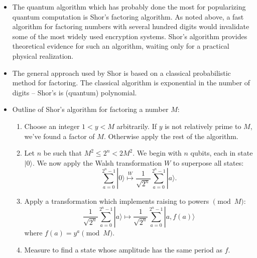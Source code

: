 \documentclass{article}
\def\pagedone{\newpage}
\def\ket#1{|{#1}\rangle}
\begin{document}
\begin{itemize}
	\item The quantum algorithm which has probably done the most for popularizing quantum computation is Shor's factoring algorithm.  As noted above, a fast algorithm for factoring numbers with several hundred digits would invalidate some of the most widely used encryption systems.  Shor's algorithm provides theoretical evidence for such an algorithm, waiting only for a practical physical realization.
	\item The general approach used by Shor is based on a classical probabilistic method for factoring.  The classical algorithm is exponential in the number of digits -- Shor's is (quantum) polynomial.
\pagedone
	\item Outline of Shor's algorithm for factoring a number $M$:
\begin{enumerate}
\item Choose an integer $1 < y < M$ arbitrarily. If $y$ is not relatively
prime to $M$, we've found a factor of $M$. Otherwise apply the
rest of the algorithm.  

	\item Let $n$ be such that $M^2 \leq 2^n < 2M^2$.
We begin with $n$ qubits, each in state $\ket 0$.  We now apply the Walsh transformation $W$ to superpose all states:
$$\sum_{a=0}^{2^n-1}\ket 0 \overset{W}\longmapsto \frac{1}{\sqrt{2^n}}\sum_{a=0}^{2^n-1}\ket a.$$

	\item Apply a transformation which implements raising to powers $\pmod{M}$:
	$$\frac{1}{\sqrt{2^n}}\sum_{a=0}^{2^n-1}\ket a \mapsto \frac{1}{\sqrt{2^n}}\sum_{a=0}^{2^n-1}\ket {a, f(a)}$$
where $f(a) = y^a\pmod{M}$.
 
\item Measure to find a state whose amplitude has the same period as $f$.



\end{enumerate}
\end{itemize}
\end{document}
